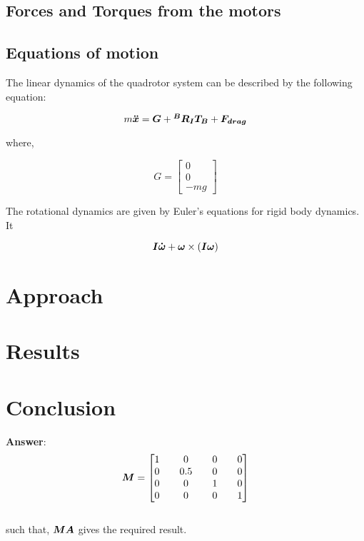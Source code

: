 \documentclass[12pt,fleqn]{article}
\newcommand{\mbm}[1]{\mbox{\boldmath $#1$}}
\begin{document}
\subsection{Forces and Torques from the motors}

\subsection{Equations of motion}

The linear dynamics of the quadrotor system can be described by the
following equation:

$$ m \mbm{\ddot{x}} = \mbm{G} + \mbm{^BR_IT_{B}} + \mbm{F_{drag}} $$

where, 

$$ G = \begin{bmatrix} 0 \\ 0 \\ -mg \end{bmatrix} $$

The rotational dynamics are given by Euler's equations for rigid body
dynamics. It

$$ \mbm{I\dot{\omega}} + \mbm{\omega} \times (\mbm{I\omega}) $$



\section{Approach}

\section{Results}

\section{Conclusion}

  \textbf{Answer}: $$ \mbm{M} = \begin{bmatrix}1&&0&&0&&0 \\ 0&&0.5&&0&&0 \\ 0&&0&&1&&0 \\ 0&&0&&0&&1 \end{bmatrix} $$ \\ such that, $\mbm{MA}$ gives the required result.   
\end{document}

